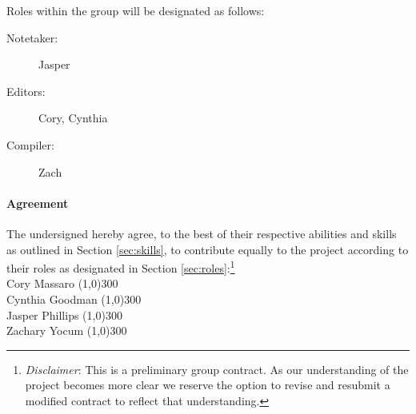 \documentclass{article}
\newcommand{\sigline}[2]{\vspace{2em} #1 \hfill \line(1,0){#2}}
\begin{document}
Roles within the group will be designated as follows:

\begin{description}
    \item [Notetaker:] Jasper
    \item [Editors:] Cory, Cynthia
    \item [Compiler:] Zach
\end{description}

\paragraph{Agreement} %
\label{par:agreement}
The undersigned hereby agree, to the best of their respective abilities and skills as outlined in Section \ref{sec:skills}, to contribute equally to the project according to their roles as designated in Section \ref{sec:roles}:\footnote{\emph{Disclaimer}: This is a preliminary group contract. As our understanding of the project becomes more clear we reserve the option to revise and resubmit a modified contract to reflect that understanding.}
\vspace{3em}\\
\sigline{Cory Massaro}{300}\\
\sigline{Cynthia Goodman}{300}\\
\sigline{Jasper Phillips}{300}\\
\sigline{Zachary Yocum}{300}\\
\end{document}
